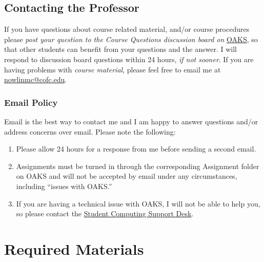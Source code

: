 \hypertarget{contacting-the-professor}{%
\subsection{Contacting the Professor}\label{contacting-the-professor}}

If you have questions about course related material, and/or course
procedures please \emph{post your question to the Course Questions
discussion board on} \href{https://lms.cofc.edu/d2l/login}{OAKS}, so
that other students can benefit from your questions and the answer. I
will respond to discussion board questions within 24 hours, \emph{if not
sooner}. If you are having problems with \emph{course material}, please
feel free to email me at \url{nowlinmc@cofc.edu}.

\hypertarget{email-policy}{%
\subsubsection{Email Policy}\label{email-policy}}

Email is the best way to contact me and I am happy to answer questions
and/or address concerns over email. Please note the following:

\begin{enumerate}
\def\labelenumi{\arabic{enumi}.}

\item
  Please allow 24 hours for a response from me before sending a second
  email.
\item
  Assignments must be turned in through the corresponding Assignment
  folder on OAKS and will not be accepted by email under any
  circumstances, including ``issues with OAKS.''
\item
  If you are having a technical issue with OAKS, I will not be able to
  help you, so please contact the
  \href{https://it.cofc.edu/help/studentcomputing.php}{Student Computing
  Support Desk}.
\end{enumerate}

\hypertarget{required-materials}{%
\section{Required Materials}\label{required-materials}}

